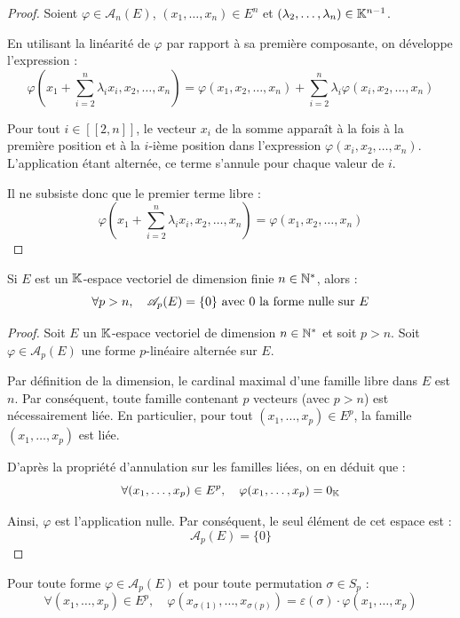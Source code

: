 \documentclass[12pt, a4paper]{report}
\begin{document}
\begin{proof}
    Soient $\varphi \in \mathscr A_n(E)$, $(x_1, \dots, x_n) \in E^n$ et $(\lambda_2, \dots, \lambda_n) \in \mathbb{K}^{n-1}$.
    
    En utilisant la linéarité de $\varphi$ par rapport à sa première composante, on développe l'expression :
    $$\varphi\left(x_1 + \sum_{i=2}^{n} \lambda_i x_i, x_2, \dots, x_n\right) = \varphi(x_1, x_2, \dots, x_n) + \sum_{i=2}^{n} \lambda_i \varphi(x_i, x_2, \dots, x_n)$$

    Pour tout $i \in [\![2,n]\!]$, le vecteur $x_i$ de la somme apparaît à la fois à la première position et à la $i$-ième position dans l'expression $\varphi(x_i, x_2, \dots, x_n)$. L'application étant alternée, ce terme s'annule pour chaque valeur de $i$. 
    
    Il ne subsiste donc que le premier terme libre :
    $$\varphi\left(x_1 + \sum_{i=2}^{n} \lambda_i x_i, x_2, \dots, x_n\right) = \varphi(x_1, x_2, \dots, x_n)$$
\end{proof}

\begin{consequence}
    Si $E$ est un $\mathbb{K}$-espace vectoriel de dimension finie $n \in \mathbb{N}^*$, alors :
    $$\forall p > n, \quad \mathscr A_p(E) = \{0\} \text{ avec } 0 \text{ la forme nulle sur } E$$
\end{consequence}

\begin{proof}
    Soit $E$ un $\mathbb{K}$-espace vectoriel de dimension $n \in \mathbb{N}^*$ et soit $p > n$.
    Soit $\varphi \in \mathscr A_p(E)$ une forme $p$-linéaire alternée sur $E$. 
    
    Par définition de la dimension, le cardinal maximal d'une famille libre dans $E$ est $n$. Par conséquent, toute famille contenant $p$ vecteurs (avec $p > n$) est nécessairement liée. En particulier, pour tout $(x_1, \dots, x_p) \in E^p$, la famille $(x_1, \dots, x_p)$ est liée.

    D'après la propriété d'annulation sur les familles liées, on en déduit que :
    $$\forall (x_1, \dots, x_p) \in E^p, \quad \varphi(x_1, \dots, x_p) = 0_{\mathbb{K}}$$

    Ainsi, $\varphi$ est l'application nulle. Par conséquent, le seul élément de cet espace est :
    $$\mathscr A_p(E) = \{0\}$$
\end{proof}

\begin{property}
    Pour toute forme $\varphi \in \mathscr A_p(E)$ et pour toute permutation $\sigma \in S_p$ :
    $$\forall (x_1, \dots, x_p) \in E^p, \quad \varphi(x_{\sigma(1)}, \dots, x_{\sigma(p)}) = \varepsilon(\sigma) \cdot \varphi(x_1, \dots, x_p)$$
\end{property}
\end{document}
